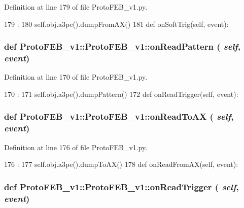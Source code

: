 Definition at line 179 of file ProtoFEB\_\-v1.py.


\begin{DoxyCode}
179                                  :
180         self.obj.a3pe().dumpFromAX()
181 
    def onSoftTrig(self, event):
\end{DoxyCode}
\hypertarget{classProtoFEB__v1_1_1ProtoFEB__v1_a7427823cf45ae9ef080644389c65eb49}{
\subsubsection[{onReadPattern}]{\setlength{\rightskip}{0pt plus 5cm}def ProtoFEB\_\-v1::ProtoFEB\_\-v1::onReadPattern ( {\em self}, \/   {\em event})}}
\label{classProtoFEB__v1_1_1ProtoFEB__v1_a7427823cf45ae9ef080644389c65eb49}


Definition at line 170 of file ProtoFEB\_\-v1.py.


\begin{DoxyCode}
170                                   :
171         self.obj.a3pe().dumpPattern()
172 
    def onReadTrigger(self, event):
\end{DoxyCode}
\hypertarget{classProtoFEB__v1_1_1ProtoFEB__v1_a709904a542a51fba791ca267d03a62c8}{
\subsubsection[{onReadToAX}]{\setlength{\rightskip}{0pt plus 5cm}def ProtoFEB\_\-v1::ProtoFEB\_\-v1::onReadToAX ( {\em self}, \/   {\em event})}}
\label{classProtoFEB__v1_1_1ProtoFEB__v1_a709904a542a51fba791ca267d03a62c8}


Definition at line 176 of file ProtoFEB\_\-v1.py.


\begin{DoxyCode}
176                                :
177         self.obj.a3pe().dumpToAX()
178 
    def onReadFromAX(self, event):
\end{DoxyCode}
\hypertarget{classProtoFEB__v1_1_1ProtoFEB__v1_a4144ba8a2f2a74f29d1ef9f5baec0e57}{
\subsubsection[{onReadTrigger}]{\setlength{\rightskip}{0pt plus 5cm}def ProtoFEB\_\-v1::ProtoFEB\_\-v1::onReadTrigger ( {\em self}, \/   {\em event})}}
\label{classProtoFEB__v1_1_1ProtoFEB__v1_a4144ba8a2f2a74f29d1ef9f5baec0e57}


